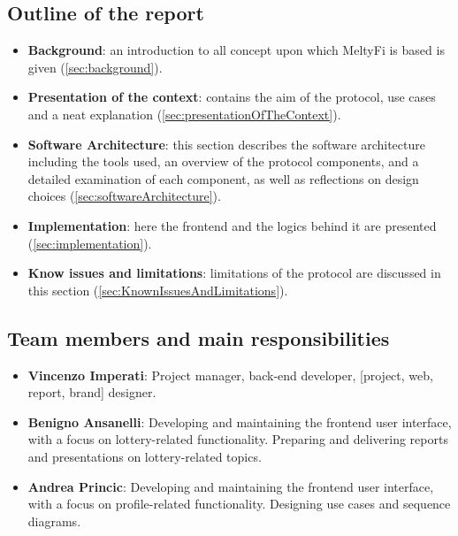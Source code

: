 \subsection{Outline of the report}
\begin{itemize}
    \item \textbf{Background}: an introduction to all concept upon which MeltyFi is based is given (\autoref{sec:background}).
    \item \textbf{Presentation of the context}: contains the aim of the protocol, use cases and a neat explanation (\autoref{sec:presentationOfTheContext}).
    \item \textbf{Software Architecture}: this section describes the software architecture including the tools used, an overview of the protocol components, and a detailed examination of each component, as well as reflections on design choices (\autoref{sec:softwareArchitecture}).
    \item \textbf{Implementation}: here the frontend and the logics behind it are presented (\autoref{sec:implementation}).
    \item \textbf{Know issues and limitations}: limitations of the protocol are discussed in this section (\autoref{sec:KnownIssuesAndLimitations}).
\end{itemize}

\subsection{Team members and main responsibilities}
\begin{itemize}
    \item \textbf{Vincenzo Imperati}: Project manager, back-end developer, [project, web, report, brand] designer.
    \item \textbf{Benigno Ansanelli}: Developing and maintaining the frontend user interface, with a focus on lottery-related functionality. Preparing and delivering reports and presentations on lottery-related topics.
    \item \textbf{Andrea Princic}: Developing and maintaining the frontend user interface, with a focus on profile-related functionality. Designing use cases and sequence diagrams.
\end{itemize}


